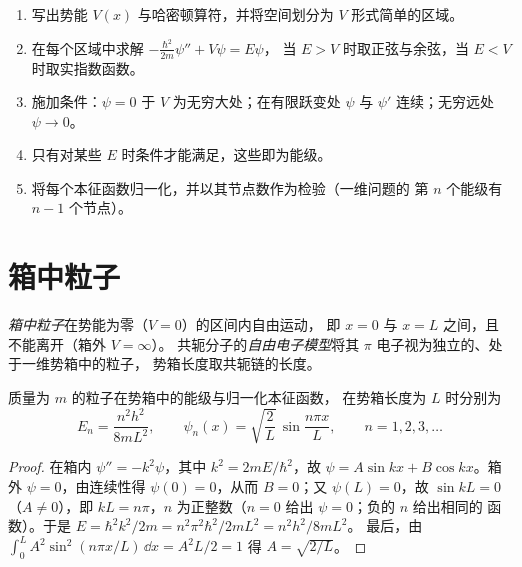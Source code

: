 \begin{method}[一维模型的求解]\label{met:b3:quantum-model-systems:one-dimensional}
\begin{enumerate}
  \item 写出势能 $V(x)$ 与哈密顿算符，并将空间划分为
        $V$ 形式简单的区域。
  \item 在每个区域中求解 $-\frac{\hbar^2}{2m}\psi'' + V\psi = E\psi$，
        当 $E > V$ 时取正弦与余弦，当 $E < V$ 时取实指数函数。
  \item 施加条件：$\psi = 0$ 于 $V$ 为无穷大处；在有限跃变处
        $\psi$ 与 $\psi'$ 连续；无穷远处 $\psi \to 0$。
  \item 只有对某些 $E$ 时条件才能满足，这些即为能级。
  \item 将每个本征函数归一化，并以其节点数作为检验（一维问题的
        第 $n$ 个能级有 $n - 1$ 个节点）。
\end{enumerate}
\end{method}

\section{箱中粒子}

\begin{definition}\label{def:b3:quantum-model-systems:box}
\emph{箱中粒子}在势能为零（$V = 0$）的区间内自由运动，
即 $x = 0$ 与 $x = L$ 之间，且不能离开（箱外 $V = \infty$）。
共轭分子的\emph{自由电子模型}将其
$\pi$ 电子视为独立的、处于一维势箱中的粒子，
势箱长度取共轭链的长度。
\end{definition}

\begin{theorem}[势箱的能级]\label{thm:b3:quantum-model-systems:box}
质量为 $m$ 的粒子在势箱中的能级与归一化本征函数，
在势箱长度为 $L$ 时分别为
\[
E_n = \frac{n^2h^2}{8mL^2}, \qquad \psi_n(x) = \sqrt{\frac2L}\,\sin\frac{n\pi
x}{L}, \qquad n = 1, 2, 3, \dots
\]
\end{theorem}

\begin{proof}
在箱内 $\psi'' = -k^2\psi$，其中 $k^2 = 2mE/\hbar^2$，故 $\psi = A\sin kx +
B\cos kx$。箱外 $\psi = 0$，由连续性得 $\psi(0) = 0$，从而 $B =
0$；又 $\psi(L) = 0$，故 $\sin kL = 0$（$A \ne 0$），即 $kL = n\pi$，$n$
为正整数（$n = 0$ 给出 $\psi = 0$；负的 $n$ 给出相同的
函数）。于是 $E = \hbar^2k^2/2m = n^2\pi^2\hbar^2/2mL^2 = n^2h^2/8mL^2$。
最后，由 $\int_0^L A^2\sin^2(n\pi x/L)\,\dd x = A^2L/2 = 1$ 得 $A =
\sqrt{2/L}$。
\end{proof}

